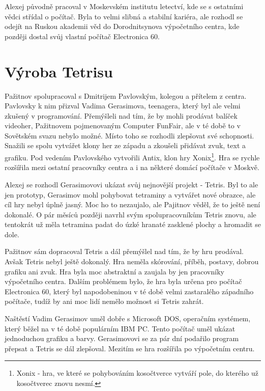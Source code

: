 \documentclass[12pt]{report}			%
\begin{document}
Alexej původně pracoval v Moskevském institutu letectví, kde se s ostatními vědci střídal o počítač. Byla to velmi slibná a stabilní kariéra, ale rozhodl se odejít na Ruskou akademii věd do Dorodnitsynova výpočetního centra, kde později dostal svůj vlastní počítač Electronica 60. \cite{Brown2016}\\

			\section{Výroba Tetrisu}
Pažitnov spolupracoval s Dmitrijem Pavlovským, kolegou a přítelem z centra. Pavlovsky k nim přizval Vadima Gerasimova, teenagera, který byl ale velmi zkušený v programování. Přemýšleli nad tím, že by mohli prodávat balíček videoher, Pažitnovem pojmenovaným Computer FunFair, ale v té době to v Sovětském svazu nebylo možné. Místo toho se rozhodli zlepšovat své schopnosti. Snažili se spolu vytvářet klony her ze západu a zkoušeli přidávat zvuk, text a grafiku. Pod vedením Pavlovského vytvořili Antix, klon hry Xonix\footnote{Xonix \-- hra, ve které se pohybováním kosočtverce vytváří pole, do kterého už kosočtverec znovu nesmí.}. Hra se rychle rozšířila mezi ostatní pracovníky centra a i na některé domácí počítače v Moskvě.\cite{Ackerman2016} 

Alexej se rozhodl Gerasimovovi ukázat svůj nejnovější projekt - Tetris. Byl to ale jen prototyp, Gerasimov mohl pohybovat tetraminy a vytvářet nové obrazce, ale cíl hry nebyl úplně jasný. Moc ho to nezaujalo, ale Pajitnov věděl, že to ještě není dokonalé. O pár měsíců později navrhl svým spolupracovníkům Tetris znovu, ale tentokrát už měla tetramina padat do úzké hranaté zasklené plochy a hromadit se dole. \cite{Ackerman2016}

Pažitnov sám dopracoval Tetris a dál přemýšlel nad tím, že by hru prodával. Avšak Tetris nebyl ještě dokonalý. Hra neměla skórování, příběh, postavy, dobrou grafiku ani zvuk. Hra byla moc abstraktní a zaujala by jen pracovníky výpočetního centra. Dalším problémem bylo, že hra byla určena pro počítač Electronica 60, který byl napodobeninou v té době velmi zastaralého západního počítače, tudíž by ani moc lidí nemělo možnost si Tetris zahrát. \cite{Ackerman2016}

Naštěstí Vadim Gerasimov uměl dobře s Microsoft DOS, operačním systémem, který běžel na v té době populárním IBM PC. Tento počítač uměl ukázat jednoduchou grafiku a barvy. Gerasimovovi se za pár dní podařilo program přepsat a Tetris se dál zlepšoval. Mezitím se hra rozšířila po výpočetním centru. \cite{Ackerman2016}
\end{document}
